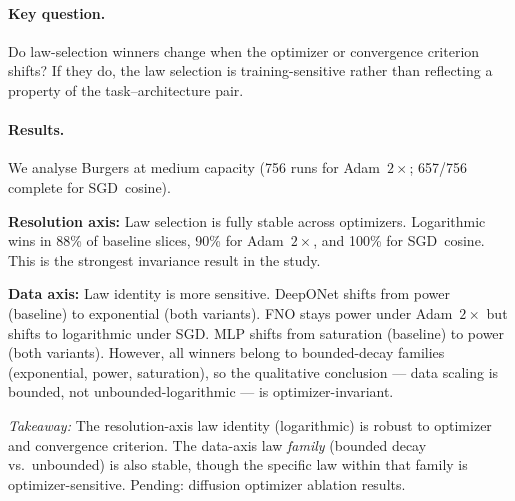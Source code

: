 \documentclass[11pt]{article}
\begin{document}
\paragraph{Key question.}
Do law-selection winners change when the optimizer or convergence
criterion shifts? If they do, the law selection is training-sensitive
rather than reflecting a property of the task--architecture pair.

\paragraph{Results.}
We analyse Burgers at medium capacity (756 runs for
Adam~$2\times$; 657/756 complete for SGD~cosine).

\textbf{Resolution axis:} Law selection is fully stable across
optimizers. Logarithmic wins in 88\% of baseline slices,
90\% for Adam~$2\times$, and 100\% for SGD~cosine. This is
the strongest invariance result in the study.

\textbf{Data axis:} Law identity is more sensitive.
DeepONet shifts from power (baseline) to exponential (both variants).
FNO stays power under Adam~$2\times$ but shifts to logarithmic
under SGD. MLP shifts from saturation (baseline) to power (both
variants). However, all winners belong to bounded-decay families
(exponential, power, saturation), so the qualitative conclusion ---
data scaling is bounded, not unbounded-logarithmic --- is
optimizer-invariant.

\emph{Takeaway:} The resolution-axis law identity (logarithmic)
is robust to optimizer and convergence criterion. The data-axis
law \emph{family} (bounded decay vs.\ unbounded) is also stable,
though the specific law within that family is optimizer-sensitive.
Pending: diffusion optimizer ablation results.
\end{document}
